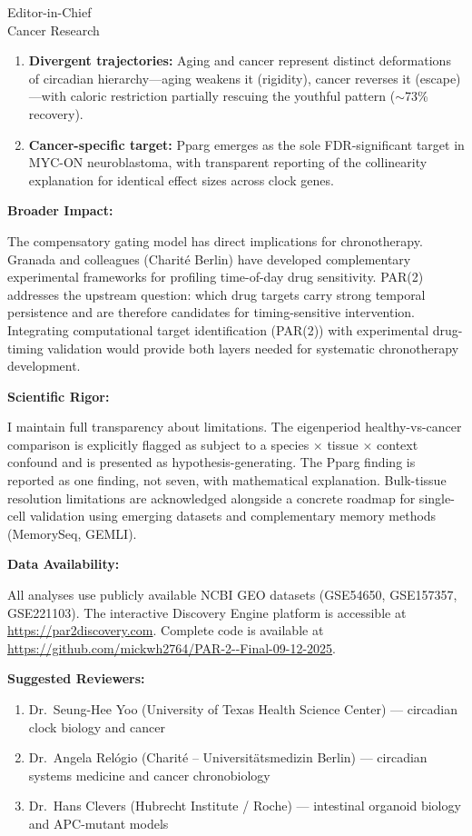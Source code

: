 \documentclass[11pt]{letter}
\begin{document}
\begin{letter}{Editor-in-Chief \\ Cancer Research}
\begin{enumerate}
\item \textbf{Divergent trajectories:} Aging and cancer represent distinct deformations of circadian hierarchy---aging weakens it (rigidity), cancer reverses it (escape)---with caloric restriction partially rescuing the youthful pattern ($\sim$73\% recovery).

\item \textbf{Cancer-specific target:} Pparg emerges as the sole FDR-significant target in MYC-ON neuroblastoma, with transparent reporting of the collinearity explanation for identical effect sizes across clock genes.
\end{enumerate}

\textbf{Broader Impact:}

The compensatory gating model has direct implications for chronotherapy. Granada and colleagues (Charit\'{e} Berlin) have developed complementary experimental frameworks for profiling time-of-day drug sensitivity. PAR(2) addresses the upstream question: which drug targets carry strong temporal persistence and are therefore candidates for timing-sensitive intervention. Integrating computational target identification (PAR(2)) with experimental drug-timing validation would provide both layers needed for systematic chronotherapy development.

\textbf{Scientific Rigor:}

I maintain full transparency about limitations. The eigenperiod healthy-vs-cancer comparison is explicitly flagged as subject to a species $\times$ tissue $\times$ context confound and is presented as hypothesis-generating. The Pparg finding is reported as one finding, not seven, with mathematical explanation. Bulk-tissue resolution limitations are acknowledged alongside a concrete roadmap for single-cell validation using emerging datasets and complementary memory methods (MemorySeq, GEMLI).

\textbf{Data Availability:}

All analyses use publicly available NCBI GEO datasets (GSE54650, GSE157357, GSE221103). The interactive Discovery Engine platform is accessible at \url{https://par2discovery.com}. Complete code is available at \url{https://github.com/mickwh2764/PAR-2--Final-09-12-2025}.

\textbf{Suggested Reviewers:}

\begin{enumerate}
    \item Dr.~Seung-Hee Yoo (University of Texas Health Science Center) --- circadian clock biology and cancer
    \item Dr.~Angela Relógio (Charit\'{e} -- Universit\"{a}tsmedizin Berlin) --- circadian systems medicine and cancer chronobiology
    \item Dr.~Hans Clevers (Hubrecht Institute / Roche) --- intestinal organoid biology and APC-mutant models
\end{enumerate}


\end{letter}
\end{document}
